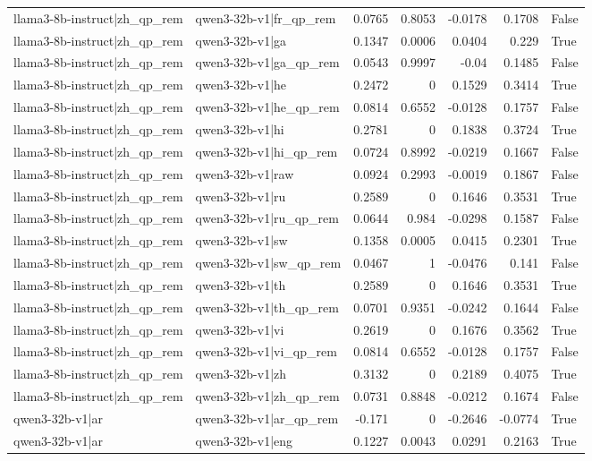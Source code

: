 \begin{table}
\begin{tabular}{l l r r r r l}
llama3-8b-instruct|zh_qp_rem & qwen3-32b-v1|fr_qp_rem & 0.0765 & 0.8053 & -0.0178 & 0.1708 & False \\
llama3-8b-instruct|zh_qp_rem & qwen3-32b-v1|ga & 0.1347 & 0.0006 & 0.0404 & 0.229 & True \\
llama3-8b-instruct|zh_qp_rem & qwen3-32b-v1|ga_qp_rem & 0.0543 & 0.9997 & -0.04 & 0.1485 & False \\
llama3-8b-instruct|zh_qp_rem & qwen3-32b-v1|he & 0.2472 & 0 & 0.1529 & 0.3414 & True \\
llama3-8b-instruct|zh_qp_rem & qwen3-32b-v1|he_qp_rem & 0.0814 & 0.6552 & -0.0128 & 0.1757 & False \\
llama3-8b-instruct|zh_qp_rem & qwen3-32b-v1|hi & 0.2781 & 0 & 0.1838 & 0.3724 & True \\
llama3-8b-instruct|zh_qp_rem & qwen3-32b-v1|hi_qp_rem & 0.0724 & 0.8992 & -0.0219 & 0.1667 & False \\
llama3-8b-instruct|zh_qp_rem & qwen3-32b-v1|raw & 0.0924 & 0.2993 & -0.0019 & 0.1867 & False \\
llama3-8b-instruct|zh_qp_rem & qwen3-32b-v1|ru & 0.2589 & 0 & 0.1646 & 0.3531 & True \\
llama3-8b-instruct|zh_qp_rem & qwen3-32b-v1|ru_qp_rem & 0.0644 & 0.984 & -0.0298 & 0.1587 & False \\
llama3-8b-instruct|zh_qp_rem & qwen3-32b-v1|sw & 0.1358 & 0.0005 & 0.0415 & 0.2301 & True \\
llama3-8b-instruct|zh_qp_rem & qwen3-32b-v1|sw_qp_rem & 0.0467 & 1 & -0.0476 & 0.141 & False \\
llama3-8b-instruct|zh_qp_rem & qwen3-32b-v1|th & 0.2589 & 0 & 0.1646 & 0.3531 & True \\
llama3-8b-instruct|zh_qp_rem & qwen3-32b-v1|th_qp_rem & 0.0701 & 0.9351 & -0.0242 & 0.1644 & False \\
llama3-8b-instruct|zh_qp_rem & qwen3-32b-v1|vi & 0.2619 & 0 & 0.1676 & 0.3562 & True \\
llama3-8b-instruct|zh_qp_rem & qwen3-32b-v1|vi_qp_rem & 0.0814 & 0.6552 & -0.0128 & 0.1757 & False \\
llama3-8b-instruct|zh_qp_rem & qwen3-32b-v1|zh & 0.3132 & 0 & 0.2189 & 0.4075 & True \\
llama3-8b-instruct|zh_qp_rem & qwen3-32b-v1|zh_qp_rem & 0.0731 & 0.8848 & -0.0212 & 0.1674 & False \\
qwen3-32b-v1|ar & qwen3-32b-v1|ar_qp_rem & -0.171 & 0 & -0.2646 & -0.0774 & True \\
qwen3-32b-v1|ar & qwen3-32b-v1|eng & 0.1227 & 0.0043 & 0.0291 & 0.2163 & True \\

\end{tabular}
\end{table}
